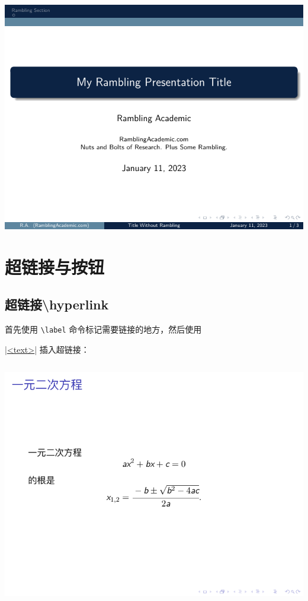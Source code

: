 \begin{column}{0.5\textwidth}
\includegraphics[page=2]{examples/beamer/color-setbeamercolor.pdf}

\section{超链接与按钮}

\subsection{超链接{\ttfamily \textbackslash hyperlink}}

首先使用 \verb|\label| 命令标记需要链接的地方，然后使用

|\hyperlink{<label>}{<text>}|
插入超链接：

\inputminted[linenos=true]{latex}{examples/beamer/hyperlink-and-button1.tex}

\includegraphics[page=1]{examples/beamer/hyperlink-and-button1.pdf}


\end{column}
